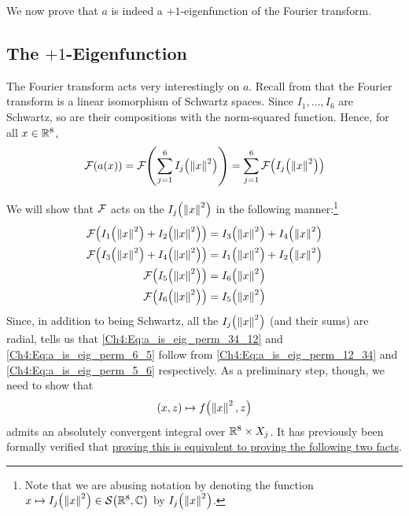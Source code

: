 We now prove that $a$ is indeed a $+1$-eigenfunction of the Fourier transform.

\subsection{The $+1$-Eigenfunction}
\label{Ch4:Subsec:Eigenfun_a}

The Fourier transform acts very interestingly on $a$. Recall from  that the Fourier transform is a linear isomorphism of Schwartz spaces. Since $I_1, \ldots, I_6$ are Schwartz, so are their compositions with the norm-squared function. Hence, for all $x \in \mathbb{R}^8$,
\begin{align*}
    \mathcal{F}\!\left( a(x) \right)
    = \mathcal{F}\!\left( \sum_{j=1}^{6} I_j\!\left( \left\lVert x \right\rVert^2 \right) \right)
    = \sum_{j=1}^{6} \mathcal{F}\!\left( I_j\!\left( \left\lVert x \right\rVert^2 \right) \right)
\end{align*}

We will show that $\mathcal{F}$ acts on the $I_j\!\left( \left\lVert x \right\rVert^2 \right)$ in the following manner:\footnote{Note that we are abusing notation by denoting the function $x \mapsto I_j\!\left( \left\lVert x \right\rVert^2 \right) \in \mathcal{S}\!\left( \mathbb{R}^8, \mathbb{C} \right)$ by $I_j\!\left( \left\lVert x \right\rVert^2 \right)$.}
\begin{align}
    \F\of{I_1\of{\norm{x}^2} + I_2\of{\norm{x}^2}} &= I_3\of{\norm{x}^2} + I_4\of{\norm{x}^2} \label{Ch4:Eq:a_is_eig_perm_12_34} \\
    \F\of{I_3\of{\norm{x}^2} + I_4\of{\norm{x}^2}} &= I_1\of{\norm{x}^2} + I_2\of{\norm{x}^2} \label{Ch4:Eq:a_is_eig_perm_34_12} \\
    \F\of{I_5\of{\norm{x}^2}} &= I_6\of{\norm{x}^2} \label{Ch4:Eq:a_is_eig_perm_5_6} \\
    \F\of{I_6\of{\norm{x}^2}} &= I_5\of{\norm{x}^2} \label{Ch4:Eq:a_is_eig_perm_6_5}
\end{align}
Since, in addition to being Schwartz, all the $I_j\!\left( \left\lVert x \right\rVert^2 \right)$ (and their sums) are radial,  tells us that \eqref{Ch4:Eq:a_is_eig_perm_34_12} and \eqref{Ch4:Eq:a_is_eig_perm_6_5} follow from \eqref{Ch4:Eq:a_is_eig_perm_12_34} and \eqref{Ch4:Eq:a_is_eig_perm_5_6} respectively. As a preliminary step, though, we need to show that
    \begin{align*}
        (x, z) \mapsto f\!\left( \left\lVert x \right\rVert^2, z \right)
    \end{align*}
    admits an absolutely convergent integral over $\mathbb{R}^8 \times X_j$. It has previously been formally verified that \href{https://github.com/leanprover-community/mathlib4/blob/5a2eaa85c555c4263e15928cef249cbaad2eb2d2/Mathlib/MeasureTheory/Integral/Prod.lean#L222-L238}{proving this is equivalent to proving the following two facts}.

